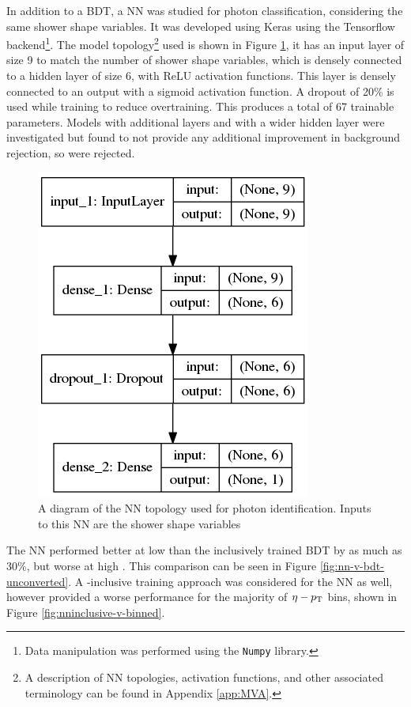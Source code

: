 In addition to a \gls{BDT}, a \gls{NN} was studied for photon classification, considering the same shower shape variables. It was developed using Keras \cite{Keras} using the Tensorflow \cite{Tensorflow} backend\footnote{Data manipulation was performed using the \texttt{Numpy} \cite{numpy} library.}. The model topology\footnote{A description of \gls{NN} topologies, activation functions, and other associated terminology can be found in Appendix \ref{app:MVA}.} used is shown in Figure \ref{fig:nn-model}, it has an input layer of size 9 to match the number of shower shape variables, which is densely connected to a hidden layer of size 6, with ReLU activation functions. This layer is densely connected to an output with a sigmoid activation function. A dropout \cite{dropout} of 20\% is used while training to reduce overtraining. This produces a total of 67 trainable parameters. Models with additional layers and with a wider hidden layer were investigated but found to not provide any additional improvement in background rejection, so were rejected.

\begin{figure}
    \centering
    \includegraphics[width=.30\textwidth]{chapters/chapter4_photonID/images/model.png}
    \caption[A diagram of the \gls{NN} topology used for photon identification]
    {A diagram of the \gls{NN} topology used for photon identification. Inputs to this \gls{NN} are the shower shape variables}
    \label{fig:nn-model}
\end{figure}

The \gls{NN} performed better at low \pt than the inclusively trained \gls{BDT} by as much as 30\%, but worse at high \pt. This comparison can be seen in Figure \ref{fig:nn-v-bdt-unconverted}. A \pt-inclusive training approach was considered for the \gls{NN} as well, however provided a worse performance for the majority of $\eta-p_{\text{T}}$ bins, shown in Figure \ref{fig:nninclusive-v-binned}.

